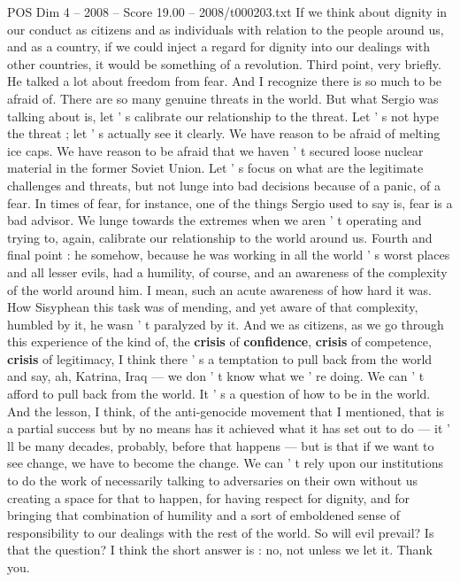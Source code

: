 \begin{textsample}{POS Dim 4 – 2008 – Score 19.00 – 2008/t000203.txt}
If we think about dignity in our conduct as citizens and as individuals with relation to the people around us, and as a country, if we could inject a regard for dignity into our dealings with other countries, it would be something of a revolution.
Third point, very briefly.
He talked a lot about freedom from fear.
And I recognize there is so much to be afraid of.
There are so many genuine threats in the world.
But what Sergio was talking about is, let ' s calibrate our relationship to the threat.
Let ' s not hype the threat ; let ' s actually see it clearly.
We have reason to be afraid of melting ice caps.
We have reason to be afraid that we haven ' t secured loose nuclear material in the former Soviet Union.
Let ' s focus on what are the legitimate challenges and threats, but not lunge into bad decisions because of a panic, of a fear.
In times of fear, for instance, one of the things Sergio used to say is, fear is a bad advisor.
We lunge towards the extremes when we aren ' t operating and trying to, again, calibrate our relationship to the world around us.
Fourth and final point : he somehow, because he was working in all the world ' s worst places and all lesser evils, had a humility, of course, and an awareness of the complexity of the world around him.
I mean, such an acute awareness of how hard it was.
How Sisyphean this task was of mending, and yet aware of that complexity, humbled by it, he wasn ' t paralyzed by it.
And we as citizens, as we go through this experience of the kind of, the \textbf{crisis} of \textbf{confidence}, \textbf{crisis} of competence, \textbf{crisis} of legitimacy, I think there ' s a temptation to pull back from the world and say, ah, Katrina, Iraq — we don ' t know what we ' re doing.
We can ' t afford to pull back from the world.
It ' s a question of how to be in the world.
And the lesson, I think, of the anti-genocide movement that I mentioned, that is a partial success but by no means has it achieved what it has set out to do — it ' ll be many decades, probably, before that happens — but is that if we want to see change, we have to become the change.
We can ' t rely upon our institutions to do the work of necessarily talking to adversaries on their own without us creating a space for that to happen, for having respect for dignity, and for bringing that combination of humility and a sort of emboldened sense of responsibility to our dealings with the rest of the world.
So will evil prevail?
Is that the question?
I think the short answer is : no, not unless we let it.
Thank you.

\end{textsample}
